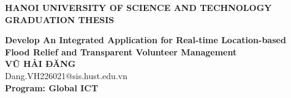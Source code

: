 \documentclass[DoAn.tex]{subfiles}
\begin{document}
\begin{titlepage}
\thispagestyle{empty}
\begin{center}

{\textbf{\large{HANOI UNIVERSITY OF SCIENCE AND TECHNOLOGY}}}\\[4cm]

{\textbf{\huge{GRADUATION THESIS}}}\\[1cm]
{\textbf{\Large{Develop An Integrated Application for Real-time Location-based Flood Relief and Transparent Volunteer Management}}\\[1cm]

{\textbf{\large{VŨ HẢI ĐĂNG}}}\\
{\large{Dang.VH226021@sis.hust.edu.vn}}\\[0.5cm]

{\textbf{\large{Program: Global ICT}}}\\

\vspace{4cm}
\begin{table}[H]
\centering
{}
\end{table}}
\end{center}



\end{titlepage}
\end{document}
